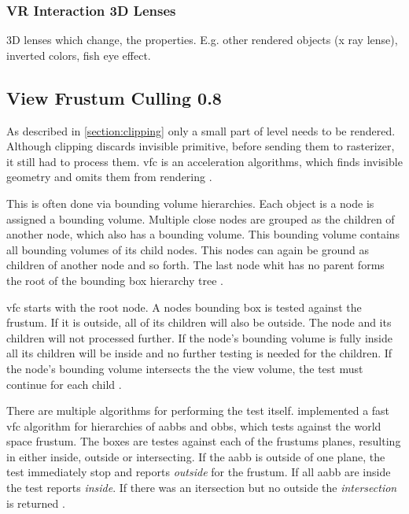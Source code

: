\subsubsection{VR Interaction 3D Lenses}
\cite{borst:2009:real}
3D lenses which change, the properties. E.g. other rendered objects (x ray lense), inverted colors, fish eye effect.


\subsection{View Frustum Culling 0.8}
As described in \ref{section:clipping} only a small part of level needs to be rendered. Although clipping discards invisible primitive, before sending them to rasterizer, it still had to process them. \Gls{vfc} is an acceleration algorithms, which finds invisible geometry and omits them from rendering \cite{assarsson:2000:optimized, akine:2018:realtime}.

This is often done via bounding volume hierarchies. Each object is a node is assigned a bounding volume. Multiple close nodes are grouped as the children of another node, which also has a bounding volume. This bounding volume contains all bounding volumes of its child nodes. This nodes can again be ground as children of another node and so forth. The last node whit has no parent forms the root of the bounding box hierarchy tree \cite{clark:1976:hierarchical, assarsson:2000:optimized, akine:2018:realtime}.

\gls{vfc} starts with the root node. A nodes bounding box is tested against the frustum. If it is outside, all of its children will also be outside. The node and its children will not processed further. If the node's bounding volume is fully inside all its children will be inside and no further testing is needed for the children. If the node's bounding volume intersects the the view volume, the test must continue for each child \cite{akine:2018:realtime}.

There are multiple algorithms for performing the test itself. \textcite{assarsson:2000:optimized} implemented a fast \gls{vfc} algorithm for hierarchies of \glspl{aabb} and \glspl{obb}, which tests against the world space frustum. The boxes are testes against each of the frustums planes, resulting in either inside, outside or intersecting. If the \gls{aabb} is outside of one plane, the test immediately stop and reports \textit{outside} for the frustum. If all \gls{aabb} are inside the test reports \textit{inside}. If there was an itersection but no outside the \textit{intersection} is returned \cite{assarsson:2000:optimized}.

